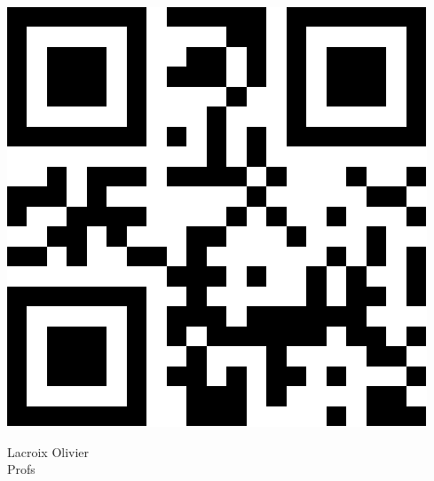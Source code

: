 \documentclass[a4paper,11pt,fleqn]{article}
\begin{document}
\Huge

\begin{block} %
{}\hfill {}



\vspace{1cm}


\begin{minipage}{0.3\linewidth}
\includegraphics[width=\linewidth]{./1.pdf}
\end{minipage}
{}\hfill {}
\begin{minipage}{0.33\linewidth}
{}\hfill {}
{}\hfill {}


\begin{center}
	Lacroix Olivier\\
	Profs
\end{center}


\end{minipage}
\end{block}
\end{document}
